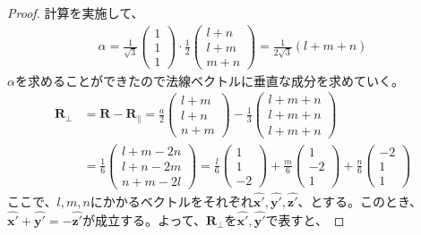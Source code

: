 \documentclass[a4paper,11pt,dvipdfmx]{jsarticle}
\begin{document}
\begin{enumerate}
\begin{itemize}
\begin{proof}
      計算を実施して、
      \begin{align*}
        \alpha = 
          \frac{1}{\sqrt{3}} \begin{pmatrix} 1 \\ 1 \\ 1 \end{pmatrix} 
          \cdot \frac{1}{2} \begin{pmatrix} l + n \\ l + m \\ m + n \end{pmatrix}
          = \frac{1}{2 \sqrt{3}} \left( l + m + n \right)
      \end{align*}
      $\alpha$を求めることができたので法線ベクトルに垂直な成分を求めていく。
      \begin{align*}
        \boldsymbol{R}_{\perp} &= \boldsymbol{R} - \boldsymbol{R}_{\parallel} = 
          \frac{a}{2} \begin{pmatrix}l + m \\ l + n \\ n + m\end{pmatrix} 
          - \frac{1}{3} \begin{pmatrix}l + m + n \\ l + m + n  \\ l + m + n \end{pmatrix}
          \\
          &= \frac{1}{6}\begin{pmatrix}l + m - 2n \\ l + n - 2m \\ n + m - 2l\end{pmatrix}
          = \frac{l}{6}\begin{pmatrix}1 \\ 1 \\ -2 \end{pmatrix} + \frac{m}{6}\begin{pmatrix}1 \\ -2 \\ 1 \end{pmatrix} + \frac{n}{6}\begin{pmatrix}-2 \\ 1 \\ 1 \end{pmatrix}
      \end{align*}
      ここで、$l, m , n$にかかるベクトルをそれぞれ$\hat{\boldsymbol{x}'}, \hat{\boldsymbol{y}'}, \hat{\boldsymbol{z}'}$、とする。このとき、$\hat{\boldsymbol{x}'} + \hat{\boldsymbol{y}'} = - \hat{\boldsymbol{z}'}$が成立する。よって、$\boldsymbol{R}_{\perp}$を$\hat{\boldsymbol{x}'}, \hat{\boldsymbol{y}'}$で表すと、

\end{proof}
\end{itemize}
\end{enumerate}
\end{document}
